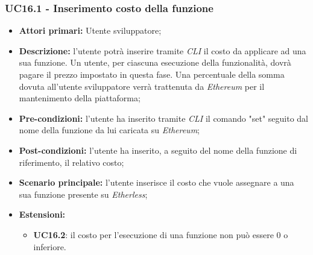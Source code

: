 \subsubsection{UC16.1 - Inserimento costo della funzione}
\begin{itemize}
	\item \textbf{Attori primari:} Utente sviluppatore;
	\item \textbf{Descrizione:} l'utente potrà inserire tramite \textit{CLI} il costo da applicare ad una sua funzione. Un utente, per ciascuna esecuzione della funzionalità, dovrà pagare il prezzo impostato in questa fase. Una percentuale della somma dovuta all'utente sviluppatore verrà trattenuta da \textit{Ethereum} per il mantenimento della piattaforma; 
	\item \textbf{Pre-condizioni:} l'utente ha inserito tramite \textit{CLI\glo} il comando "set" seguito dal nome della funzione da lui caricata su \textit{Ethereum};
	\item \textbf{Post-condizioni:} l'utente ha inserito, a seguito del nome della funzione di riferimento, il relativo costo;
	\item \textbf{Scenario principale:} l'utente inserisce il costo che vuole assegnare a una sua funzione presente su \textit{Etherless};
	\item \textbf{Estensioni:} 
	\begin{itemize}
		\item \textbf{UC16.2}: il costo per l'esecuzione di una funzione non può essere 0 o inferiore.
	\end{itemize}
\end{itemize}